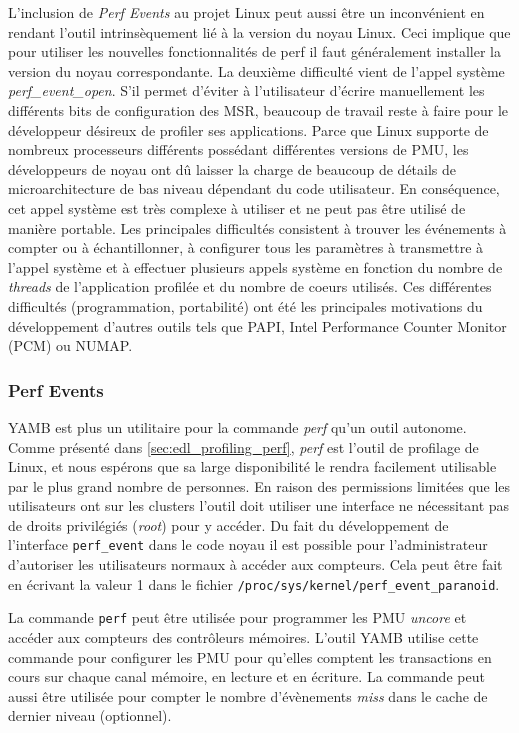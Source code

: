             L'inclusion de \textit{Perf Events} au projet Linux peut aussi être un inconvénient en rendant l'outil intrinsèquement lié à la version du noyau Linux. Ceci implique que pour utiliser les nouvelles fonctionnalités de perf il faut généralement installer la version du noyau correspondante. La deuxième difficulté vient de l'appel système \textit{perf\_event\_open}. S'il permet d'éviter à l'utilisateur d'écrire manuellement les différents bits de configuration des MSR, beaucoup de travail reste à faire pour le développeur désireux de profiler ses applications. Parce que Linux supporte de nombreux processeurs différents possédant différentes versions de PMU, les développeurs de noyau ont dû laisser la charge de beaucoup de détails de microarchitecture de bas niveau dépendant du code utilisateur. En conséquence, cet appel système est très complexe à utiliser et ne peut pas être utilisé de manière portable. Les principales difficultés consistent à trouver les événements à compter ou à échantillonner, à configurer tous les paramètres à transmettre à l'appel système et à effectuer plusieurs appels système en fonction du nombre de \textit{threads} de l'application profilée et du nombre de coeurs utilisés. Ces différentes difficultés (programmation, portabilité) ont été les principales motivations du développement d'autres outils tels que PAPI, Intel Performance Counter Monitor (PCM) ou NUMAP\cite{Selva2017}.

    \subsubsection{Perf Events}
     
        YAMB est plus un utilitaire pour la commande \textit{perf} qu'un outil autonome. Comme présenté dans \autoref{sec:edl_profiling_perf}, \textit{perf} est l'outil de profilage de Linux, et nous espérons que sa large disponibilité le rendra facilement utilisable par le plus grand nombre de personnes.  En raison des permissions limitées que les utilisateurs ont sur les clusters l'outil doit utiliser une interface ne nécessitant pas de droits privilégiés (\textit{root}) pour y accéder. Du fait du développement de l'interface \verb=perf_event= dans le code noyau il est possible pour l'administrateur d'autoriser les utilisateurs normaux à accéder aux compteurs. Cela peut être fait en écrivant la valeur 1 dans le fichier \verb=/proc/sys/kernel/perf_event_paranoid=.
        
        La commande \verb=perf= peut être utilisée pour programmer les PMU \textit{uncore} et accéder aux compteurs des contrôleurs mémoires. L'outil YAMB utilise cette commande pour configurer les PMU pour qu'elles comptent les transactions en cours sur chaque canal mémoire, en lecture et en écriture. La commande peut aussi être utilisée pour compter le nombre d'évènements \textit{miss} dans le cache de dernier niveau (optionnel).
        
